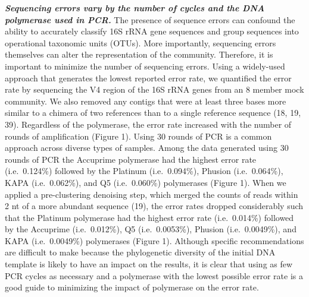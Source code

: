 \documentclass[11pt,]{article}
\begin{document}
\textbf{\emph{Sequencing errors vary by the number of cycles and the DNA
polymerase used in PCR.}} The presence of sequence errors can confound
the ability to accurately classify 16S rRNA gene sequences and group
sequences into operational taxonomic units (OTUs). More importantly,
sequencing errors themselves can alter the representation of the
community. Therefore, it is important to minimize the number of
sequencing errors. Using a widely-used approach that generates the
lowest reported error rate, we quantified the error rate by sequencing
the V4 region of the 16S rRNA genes from an 8 member mock community. We
also removed any contigs that were at least three bases more similar to
a chimera of two references than to a single reference sequence (18, 19,
39). Regardless of the polymerase, the error rate increased with the
number of rounds of amplification (Figure 1). Using 30 rounds of PCR is
a common approach across diverse types of samples. Among the data
generated using 30 rounds of PCR the Accuprime polymerase had the
highest error rate (i.e.~0.124\%) followed by the Platinum
(i.e.~0.094\%), Phusion (i.e.~0.064\%), KAPA (i.e.~0.062\%), and Q5
(i.e.~0.060\%) polymerases (Figure 1). When we applied a pre-clustering
denoising step, which merged the counts of reads within 2 nt of a more
abundant sequence (19), the error rates dropped considerably such that
the Platinum polymerase had the highest error rate (i.e.~0.014\%)
followed by the Accuprime (i.e.~0.012\%), Q5 (i.e.~0.0053\%), Phusion
(i.e.~0.0049\%), and KAPA (i.e.~0.0049\%) polymerases (Figure 1).
Although specific recommendations are difficult to make because the
phylogenetic diversity of the initial DNA template is likely to have an
impact on the results, it is clear that using as few PCR cycles as
necessary and a polymerase with the lowest possible error rate is a good
guide to minimizing the impact of polymerase on the error rate.
\end{document}
